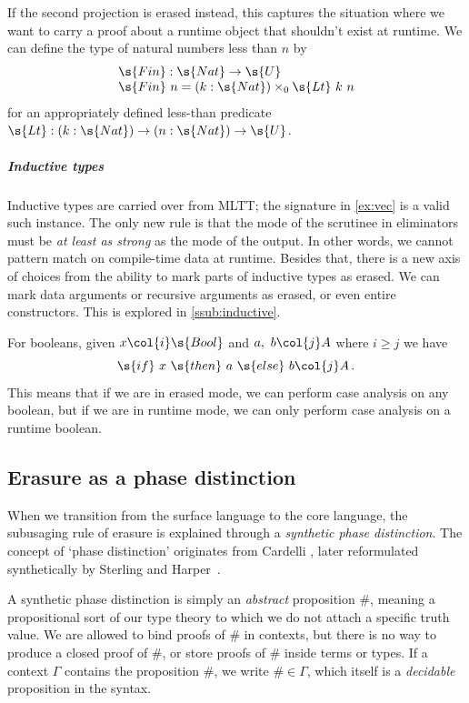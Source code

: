 \documentclass[a4paper,UKenglish,cleveref,autoref,thm-restate]{lipics-v2021}
\begin{document}
\begin{example}
If the second projection is erased instead, this captures the situation where
we want to carry a proof about a runtime object that shouldn't exist at runtime.
We can define the type of natural numbers less than $n$ by
\[\begin{array}{l}
\s{Fin} : \s{Nat} \to \s{U} \\
\s{Fin}\ n = (k : \s{Nat}) \times_0 \s{Lt}\ k\ n \end{array} \] for an
appropriately defined less-than predicate $\s{Lt} : (k : \s{Nat}) \to (n :
\s{Nat}) \to \s{U}$.
\end{example}

\subparagraph{Inductive types}
Inductive types are carried over from MLTT; the signature in \cref{ex:vec} is a
valid such instance. The only new rule is that the mode of the scrutinee in
eliminators must be \emph{at least as strong} as the mode of the output. In
other words, we cannot pattern match on compile-time data at runtime. Besides
that, there is a new axis of choices from the ability to mark parts of inductive
types as erased. We can mark data arguments or recursive arguments as erased, or
even entire constructors. This is explored in \cref{ssub:inductive}.

\begin{example}
For booleans, given $x \col{i} \s{Bool}$ and $a,\ b \col{j} A$ where
$i \geq j$ we have
\[
  \s{if}\ x\ \s{then}\ a\ \s{else}\ b \col{j} A \,.
\]
This means that if we are in erased mode, we can perform
case analysis on any boolean, but if we are in runtime mode, we
can only perform case analysis on a runtime boolean.
\end{example}


\subsection{Erasure as a phase distinction}\label{sub:phase}


When we transition from the surface language to the core language, the
subusaging rule of erasure is explained through a \emph{synthetic phase
distinction}. The concept of `phase distinction' originates from Cardelli
\cite{Cardelli1988-zp}, later reformulated synthetically by Sterling and
Harper~\cite{Sterling2021-pm}.

A synthetic phase distinction is simply an \emph{abstract} proposition $\#$,
meaning a propositional sort of our type theory to which we do not attach a
specific truth value. We are allowed to bind proofs of $\#$ in contexts, but
there is no way to produce a closed proof of $\#$, or store proofs of $\#$
inside terms or types. If a context $\Gamma$ contains the proposition $\#$, we
write $\# \in \Gamma$, which itself is a \emph{decidable} proposition in the
syntax.
\end{document}
